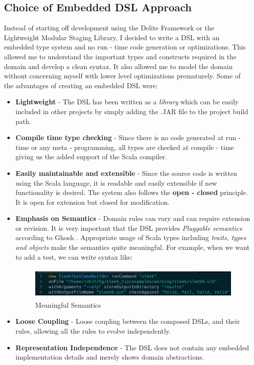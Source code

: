 \documentclass[12pt]{article}
\begin{document}
\subsection{Choice of Embedded DSL Approach}
Instead of starting off development using the Delite Framework or the Lightweight Modular Staging Library, I decided to write a DSL with an embedded type system and no run - time code generation or optimizations. This allowed me to understand the important types and constructs required in the domain and develop a clean syntax. It also allowed me to model the domain without concerning myself with lower level optimizations prematurely. Some of the advantages of creating an embedded DSL were:
\begin{itemize}
\item \textbf{Lightweight} - The DSL has been written as a \textit{library} which can be easily included in other projects by simply adding the .JAR file to the project build path.
\item \textbf{Compile time type checking} - Since there is no code generated at run - time or any meta - programming, all types are checked at compile - time giving us the added support of the Scala compiler.
\item \textbf{Easily maintainable and extensible} - Since the source code is written using the Scala language, it is readable and easily extensible if new functionality is desired. The system also follows the \textbf{open - closed} principle. It is open for extension but closed for modification.
\item \textbf{Emphasis on Semantics} - Domain rules can vary and can require extension or revision. It is very important that the DSL provides \textit{Pluggable semantics} according to Ghosh \cite{dslsInAction}. Appropriate usage of Scala types including \textit{traits, types and objects} make the semantics quite meaningful. For example, when we want to add a test, we can write syntax like:

\begin{figure}[H]
  \centering
    \includegraphics[height=60px]{figures/declarative_syntax.png}
  \caption{Meaningful Semantics}
\end{figure}

\item \textbf{Loose Coupling} - Loose coupling between the composed DSLs, and their rules, allowing all the rules to evolve independently.
\item \textbf{Representation Independence} - The DSL does not contain any embedded implementation details and merely shows domain abstractions.
\end{itemize}
\end{document}
